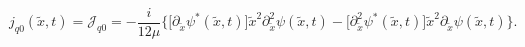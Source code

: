 \begin{equation}
\label{Eq:jq0}
j_{q0}(\tilde x, t)=\mathcal{J}_{q0}= -\frac{i}{12\mu}
\bigl \{\bigl [  \partial_{\tilde x} \psi^{*}(\tilde x,t) \bigr ]\tilde
x^2
\partial_{\tilde x}^2\psi(\tilde x,t)-
\bigl [ \partial_{\tilde x}^2\psi^{*}(\tilde x,t) \bigr ]\tilde x^2
\partial_{\tilde x} \psi(\tilde x,t)
\bigr \} .
\end{equation}

